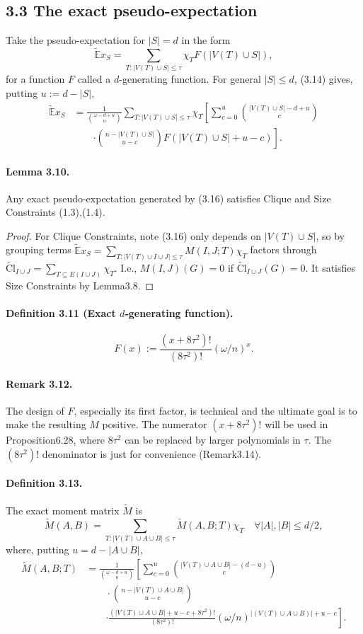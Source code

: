 \subsection*{3.3 The exact pseudo-expectation}
Take the pseudo-expectation for $|S|=d$ in the form
\[\widetilde{\mathbb E}x_S=\sum_{T:|V(T)\cup S|\le\tau}\chi_TF(|V(T)\cup S|),\]
for a function $F$ called a $d$-generating function. For general $|S|\le d$, (3.14) gives, putting $u:=d-|S|$,
\begin{align*}\widetilde{\mathbb E}x_S&=\frac1{\binom{\omega-d+u}u}\sum_{T:|V(T)\cup S|\le\tau}\chi_T\left[\sum_{c=0}^u\binom{|V(T)\cup S|-d+u}c\right.\\&\qquad\left.\cdot\binom{n-|V(T)\cup S|}{u-c}F(|V(T)\cup S|+u-c)\right].\tag{3.16}\end{align*}
\paragraph{Lemma 3.10.} Any exact pseudo-expectation generated by (3.16) satisfies Clique and Size Constraints (1.3),(1.4).
\begin{proof}For Clique Constraints, note (3.16) only depends on $|V(T)\cup S|$, so by grouping terms $\widetilde{\mathbb E}x_S=\sum_{T:|V(T)\cup I\cup J|\le\tau}M(I,J;T)\chi_T$ factors through $\widetilde{\mathrm{Cl}}_{I\cup J}=\sum_{T\subseteq E(I\cup J)}\chi_T$. I.e., $M(I,J)(G)=0$ if $\widetilde{\mathrm{Cl}}_{I\cup J}(G)=0$. It satisfies Size Constraints by Lemma3.8.\end{proof}
\paragraph{Definition 3.11 (Exact $d$-generating function).}
\[F(x):=\frac{(x+8\tau^2)!}{(8\tau^2)!}(\omega/n)^x.\]
\paragraph{Remark 3.12.} The design of $F$, especially its first factor, is technical and the ultimate goal is to make the resulting $M$ positive. The numerator $(x+8\tau^2)!$ will be used in Proposition6.28, where $8\tau^2$ can be replaced by larger polynomials in $\tau$. The $(8\tau^2)!$ denominator is just for convenience (Remark3.14).
\paragraph{Definition 3.13.} The exact moment matrix $\widetilde M$ is
\[\widetilde M(A,B)=\sum_{T:|V(T)\cup A\cup B|\le\tau}\widetilde M(A,B;T)\chi_T\quad\forall |A|,|B|\le d/2,\]
where, putting $u=d-|A\cup B|$,
\begin{align*}\widetilde M(A,B;T)&=\frac1{\binom{\omega-d+u}u}\left[\sum_{c=0}^u\binom{|V(T)\cup A\cup B|-(d-u)}c\right.\\&\qquad\cdot\binom{n-|V(T)\cup A\cup B|}{u-c}\\&\qquad\left.\cdot\frac{(|V(T)\cup A\cup B|+u-c+8\tau^2)!}{(8\tau^2)!}(\omega/n)^{|(V(T)\cup A\cup B)|+u-c}\right].\tag{3.17}\end{align*}
